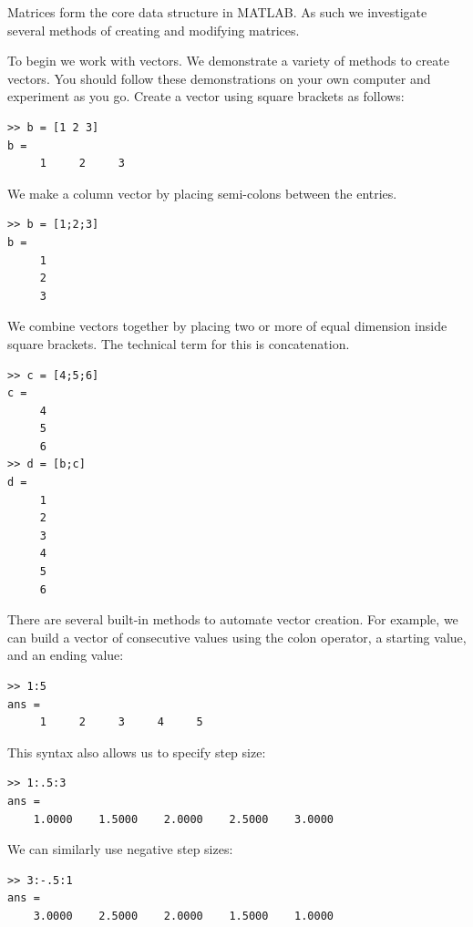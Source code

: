 
Matrices form the core data structure in MATLAB. As such we investigate several methods of creating and modifying matrices.

To begin we work with vectors. We demonstrate a variety of methods to create vectors. You should follow these demonstrations on your own computer and experiment as you go. Create a vector using square brackets as follows:

\begin{lstlisting}[style=matlab]
>> b = [1 2 3]
b =
     1     2     3  
\end{lstlisting}

We make a column vector by placing semi-colons between the entries.

\begin{lstlisting}[style=matlab]
>> b = [1;2;3]
b =
     1
     2
     3  
\end{lstlisting}

We combine vectors together by placing two or more of equal dimension inside square brackets. The technical term for this is concatenation.

\begin{lstlisting}[style=matlab]
>> c = [4;5;6]
c =
     4
     5
     6
>> d = [b;c]
d =
     1
     2
     3
     4
     5
     6  
\end{lstlisting}

There are several built-in methods to automate vector creation. For example, we can build a vector of consecutive values using the colon operator, a starting value, and an ending value:

\begin{lstlisting}[style=matlab]
>> 1:5
ans =
     1     2     3     4     5
\end{lstlisting}

This syntax also allows us to specify step size:

\begin{lstlisting}[style=matlab]
>> 1:.5:3
ans =
    1.0000    1.5000    2.0000    2.5000    3.0000
\end{lstlisting}

We can similarly use negative step sizes:

\begin{lstlisting}[style=matlab]
>> 3:-.5:1
ans =
    3.0000    2.5000    2.0000    1.5000    1.0000
\end{lstlisting}

